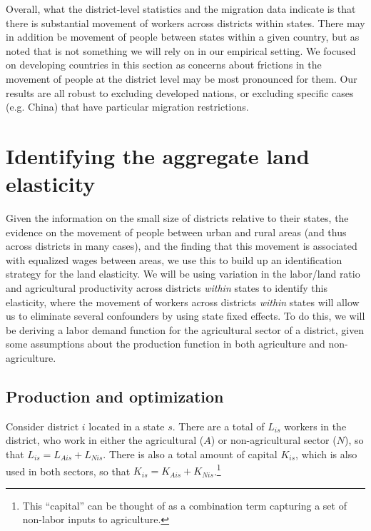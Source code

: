 \documentclass[11pt]{article}
\begin{document}
Overall, what the district-level statistics and the migration data indicate is that there is substantial movement of workers across districts within states. There may in addition be movement of people between states within a given country, but as noted that is not something we will rely on in our empirical setting. We focused on developing countries in this section as concerns about frictions in the movement of people at the district level may be most pronounced for them. Our results are all robust to excluding developed nations, or excluding specific cases (e.g. China) that have particular migration restrictions.

\section{Identifying the aggregate land elasticity}\label{SEC_agmodel}
Given the information on the small size of districts relative to their states, the evidence on the movement of people between urban and rural areas (and thus across districts in many cases), and the finding that this movement is associated with equalized wages between areas, we use this to build up an identification strategy for the land elasticity. We will be using variation in the labor/land ratio and agricultural productivity across districts \textit{within} states to identify this elasticity, where the movement of workers across districts \textit{within} states will allow us to eliminate several confounders by using state fixed effects. To do this, we will be deriving a labor demand function for the agricultural sector of a district, given some assumptions about the production function in both agriculture and non-agriculture.

\subsection{Production and optimization}
Consider district $i$ located in a state $s$. There are a total of $L_{is}$ workers in the district, who work in either the agricultural ($A$) or non-agricultural sector ($N$), so that $L_{is} = L_{Ais} + L_{Nis}$. There is also a total amount of capital $K_{is}$, which is also used in both sectors, so that $K_{is} = K_{Ais} + K_{Nis}$.\footnote{This ``capital'' can be thought of as a combination term capturing a set of non-labor inputs to agriculture.}
\end{document}
